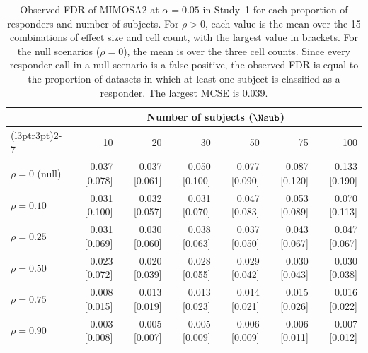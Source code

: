 \begin{table}[!h]
\centering
\footnotesize
\caption[Study~1: observed FDR of MIMOSA2 at $\alpha = 0.05$]{Observed FDR of MIMOSA2 at $\alpha = 0.05$ in Study~1 for each proportion of responders and number of subjects. For $\rho > 0$, each value is the mean over the 15 combinations of effect size and cell count, with the largest value in brackets. For the null scenarios ($\rho = 0$), the mean is over the three cell counts. Since every responder call in a null scenario is a false positive, the observed FDR is equal to the proportion of datasets in which at least one subject is classified as a responder. The largest MCSE is 0.039.\label{tbl_baseline_performance_fdr}}
\centering
\begin{tabular}[t]{lrrrrrr}
\toprule
\multicolumn{1}{c}{ } & \multicolumn{6}{c}{Number of subjects ($\Nsub$)} \\
\cmidrule(l{3pt}r{3pt}){2-7}
 & 10 & 20 & 30 & 50 & 75 & 100\\
\midrule
$\rho = 0$ (null) & 0.037 [0.078] & 0.037 [0.061] & 0.050 [0.100] & 0.077 [0.090] & 0.087 [0.120] & 0.133 [0.190]\\
\midrule
$\rho = 0.10$ & 0.031 [0.100] & 0.032 [0.057] & 0.031 [0.070] & 0.047 [0.083] & 0.053 [0.089] & 0.070 [0.113]\\
$\rho = 0.25$ & 0.031 [0.069] & 0.030 [0.060] & 0.038 [0.063] & 0.037 [0.050] & 0.043 [0.067] & 0.047 [0.067]\\
$\rho = 0.50$ & 0.023 [0.072] & 0.020 [0.039] & 0.028 [0.055] & 0.029 [0.042] & 0.030 [0.043] & 0.030 [0.038]\\
$\rho = 0.75$ & 0.008 [0.015] & 0.013 [0.019] & 0.013 [0.023] & 0.014 [0.021] & 0.015 [0.026] & 0.016 [0.022]\\
$\rho = 0.90$ & 0.003 [0.008] & 0.005 [0.007] & 0.005 [0.009] & 0.006 [0.009] & 0.006 [0.011] & 0.007 [0.012]\\
\bottomrule
\end{tabular}
\end{table}
